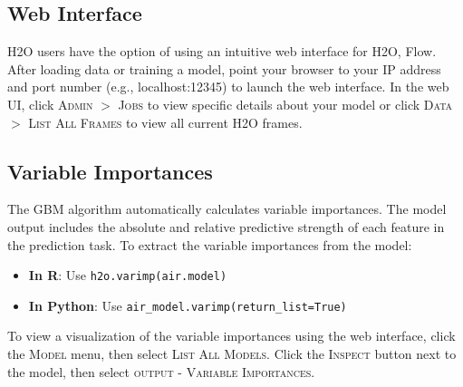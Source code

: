 \begin{minipage}{\textwidth}
\waterExampleInR

\end{minipage}

\begin{minipage}{\textwidth}
\waterExampleInPython

\end{minipage}

\subsection{Web Interface}

H2O users have the option of using an intuitive web interface for H2O, Flow. After loading data or training a model, point your browser to your IP address and port number (e.g., localhost:12345) to launch the web interface. In the web UI, click \textsc{Admin} $>$ \textsc{Jobs} to view specific details about your model or click \textsc{Data} $>$ \textsc{List All Frames} to view all current H2O frames.


\subsection{Variable Importances}

The GBM algorithm automatically calculates variable importances. The model output includes the absolute and relative predictive strength of each feature in the prediction task. To extract the variable importances from the model:
\begin{itemize}
\item \textbf{In R}: Use \texttt{h2o.varimp(air.model)} 
\item \textbf{In Python}: Use \texttt{air\_model.varimp(return\_list=True)}
\end{itemize}

To view a visualization of the variable importances using the web interface, click the \textsc{Model} menu, then select \textsc{List All Models}. Click the \textsc{Inspect} button next to the model, then select \textsc{output - Variable Importances}. 


